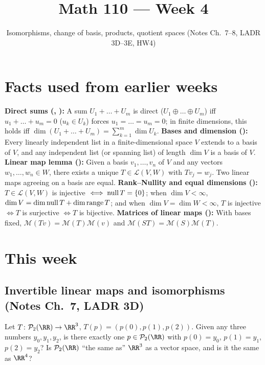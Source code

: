 \documentclass[10pt]{scrartcl}
\title{Math 110 --- Week 4}
\subtitle{Isomorphisms, change of basis, products, quotient spaces (Notes Ch.~7--8, LADR 3D--3E, HW4)}
\author{}\date{}\ihead{}
\newcommand{\PP}{\mathcal P}\newcommand{\LL}{\mathcal L}\newcommand{\MM}{\mathcal M}
\begin{document}
\maketitle

\section{Facts used from earlier weeks}
\begin{enumerate}[label=(W\arabic*),leftmargin=2.8em,itemsep=4pt]
  \ii{} \textbf{Direct sums (, ):} A sum $U_1+\dots+U_m$ is direct ($U_1\oplus\dots\oplus U_m$) iff $u_1+\dots+u_m=0$ ($u_k\in U_k$) forces $u_1=\dots=u_m=0$; in finite dimensions, this holds iff $\dim(U_1+\dots+U_m)=\sum_{k=1}^m\dim U_k$.
  \ii{} \textbf{Bases and dimension ():} Every linearly independent list in a finite-dimensional space $V$ extends to a basis of $V$, and any independent list (or spanning list) of length $\dim V$ is a basis of $V$.
  \ii{} \textbf{Linear map lemma ():} Given a basis $v_1,\dots,v_n$ of $V$ and any vectors $w_1,\dots,w_n\in W$, there exists a unique $T\in\LL(V,W)$ with $Tv_j=w_j$. Two linear maps agreeing on a basis are equal.
  \ii{} \textbf{Rank--Nullity and equal dimensions ():} $T\in\LL(V,W)$ is injective $\iff\operatorname{null} T=\{0\}$; when $\dim V<\infty$, $\dim V=\dim\operatorname{null} T+\dim\operatorname{range} T$; and when $\dim V=\dim W<\infty$, $T$ is injective $\iff T$ is surjective $\iff T$ is bijective.
  \ii{} \textbf{Matrices of linear maps ():} With bases fixed, $\MM(Tv)=\MM(T)\MM(v)$ and $\MM(ST)=\MM(S)\MM(T)$.
\end{enumerate}

\section{This week}

\subsection{Invertible linear maps and isomorphisms (Notes Ch.~7, LADR 3D)}

\begin{qbox}
  Let $T\colon\PP_2(\RR)\to\RR^3$, $T(p)=(p(0),p(1),p(2))$. Given any three numbers $y_0,y_1,y_2$, is there exactly one $p\in\PP_2(\RR)$ with $p(0)=y_0$, $p(1)=y_1$, $p(2)=y_2$? Is $\PP_2(\RR)$ ``the same as'' $\RR^3$ as a vector space, and is it the same as $\RR^4$?
\end{qbox}
\end{document}
